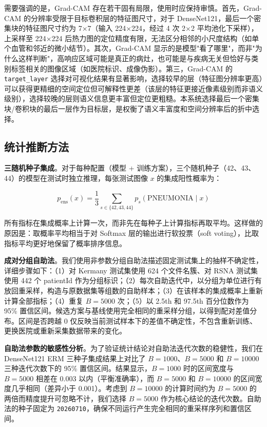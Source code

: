 \documentclass[12pt,a4paper,UTF8,openany]{ctexbook}
\begin{document}
需要强调的是，Grad-CAM 存在若干固有局限，使用时应保持审慎。首先，Grad-CAM 的分辨率受限于目标卷积层的特征图尺寸，对于 DenseNet121，最后一个密集块的特征图尺寸约为 7×7（输入 224×224，经过 4 次 2×2 平均池化下采样），上采样至 224×224 后热力图的定位精度有限，无法区分相邻的小尺度结构（如单个血管和邻近的微小结节）。其次，Grad-CAM 显示的是模型"看了哪里"，而非"为什么这样判断"，高响应区域可能是真正的病灶，也可能是与疾病无关但恰好与类别标签相关的图像区域（如医院标识、成像伪影）。第三，Grad-CAM 的 \texttt{target\_layer} 选择对可视化结果有显著影响，选择较早的层（特征图分辨率更高）可以获得更精细的空间定位但可解释性更差（该层的特征更接近像素级别而非语义级别），选择较晚的层则语义信息更丰富但定位更粗糙。本系统选择最后一个密集块/卷积块的最后一层作为目标层，是权衡了语义丰富度和空间分辨率后的折中选择。

\subsection{统计推断方法}

\textbf{三随机种子集成}。对于每种配置（模型 + 训练方案），三个随机种子（42、43、44）的模型在测试时独立推理，每张测试图像 $x$ 的集成阳性概率为：

\begin{equation}
p_{\text{ens}}(x) = \frac{1}{3}\sum_{s \in \{42, 43, 44\}} p_s(\text{PNEUMONIA} \mid x)
\end{equation}

所有指标在集成概率上计算一次，而非先在每种子上计算指标再取平均。这样做的原因是：取概率平均相当于对 Softmax 层的输出进行软投票（soft voting），比取指标平均更好地保留了概率排序信息。

\textbf{成对分组自助法}。我们使用非参数分组自助法描述固定测试集上的抽样不确定性，详细步骤如下：（1）对 Kermany 测试集使用 624 个文件名簇、对 RSNA 测试集使用 442 个 patientId 作为分组标识；（2）每次自助迭代中，以分组为单位进行有放回重采样，构造与原数据集等组数的自助样本；（3）在该样本的集成概率上重新计算全部指标；（4）重复 $B=5000$ 次；（5）以 2.5th 和 97.5th 百分位数作为 95\% 置信区间。候选方案与基线使用完全相同的重采样分组，以得到配对差值分布。区间是否跨越 0 仅反映当前测试样本下的差值不确定性，不包含重新训练、更换医院或重新采集数据带来的变化。

\textbf{自助法参数的敏感性分析}。为了验证统计结论对自助法迭代次数的稳健性，我们在 DenseNet121 ERM 三种子集成结果上对比了 $B=1000$、$B=5000$ 和 $B=10000$ 三种迭代次数下的 95\% 置信区间。结果显示，$B=1000$ 时的区间宽度与 $B=5000$ 相差在 0.003 以内（平衡准确率），而 $B=5000$ 和 $B=10000$ 的区间宽度几乎相同（差异小于 0.001）。考虑到 $B=10000$ 的计算时间约为 $B=5000$ 的两倍而精度提升可忽略不计，我们选择 $B=5000$ 作为核心结论的迭代次数。自助法的种子固定为 \texttt{20260710}，确保不同运行产生完全相同的重采样序列和置信区间。
\end{document}
